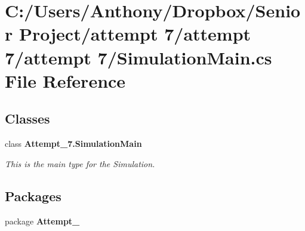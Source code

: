 \section{C:/Users/Anthony/Dropbox/Senior Project/attempt 7/attempt 7/attempt 7/SimulationMain.cs File Reference}
\label{_simulation_main_8cs}
\subsection*{Classes}
\begin{DoxyCompactItemize}
\item 
class {\bf Attempt\_\-7.SimulationMain}
\begin{DoxyCompactList}\small\item\em This is the main type for the Simulation. \item\end{DoxyCompactList}\end{DoxyCompactItemize}
\subsection*{Packages}
\begin{DoxyCompactItemize}
\item 
package {\bf Attempt\_}
\end{DoxyCompactItemize}
